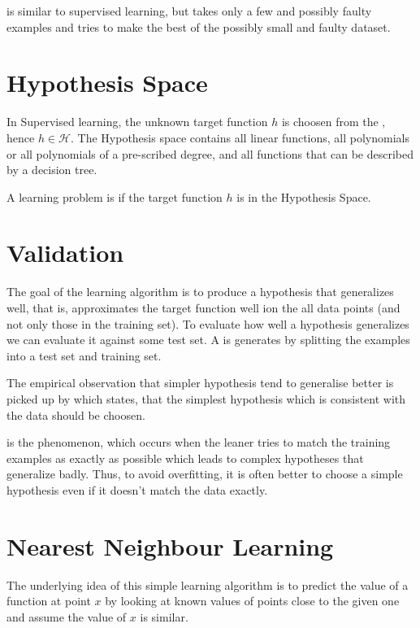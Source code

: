  is similar to supervised learning, but takes only a few and possibly faulty examples and tries to make the best of the possibly small and faulty dataset.


\section{Hypothesis Space}
In Supervised learning, the unknown target function $h$ is choosen from the , hence $h \in \mathcal{H}$. The Hypothesis space contains all linear functions, all polynomials or all polynomials of a pre-scribed degree, and all functions that can be described by a decision tree.

A learning problem is  if the target function $h$ is in the Hypothesis Space.

\section{Validation}
The goal of the learning algorithm is to produce a hypothesis that generalizes well, that is, approximates the target function well ion the all data points (and not only those in the training set). To evaluate how well a hypothesis generalizes we can evaluate it against some test set. A  is generates by splitting the examples into a test set and training set.

The empirical observation that simpler hypothesis tend to generalise better is picked up by  which states, that the simplest hypothesis which is consistent with the data should be choosen.

 is the phenomenon, which occurs when the leaner tries to match the training examples as exactly as possible which leads to complex hypotheses that generalize badly. Thus, to avoid overfitting, it is often better to choose a simple hypothesis even if it doesn't match the data exactly.

\section{Nearest Neighbour Learning}
The underlying idea of this simple learning algorithm is to predict the value of a function at point $x$ by looking at known values of points close to the given one and assume the value of $x$ is similar. 
